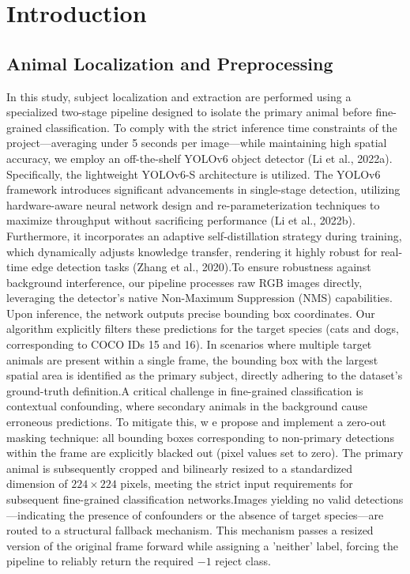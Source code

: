 \section{Introduction}
\label{sec:intro}


\subsection{Animal Localization and Preprocessing}
In this study, subject localization and extraction are performed using a specialized two-stage pipeline designed to isolate the primary animal before fine-grained classification. 
To comply with the strict inference time constraints of the project—averaging under 5 seconds per image—while maintaining high spatial accuracy, 
we employ an off-the-shelf YOLOv6 object detector (Li et al., 2022a). Specifically, the lightweight YOLOv6-S architecture is utilized. The YOLOv6 framework introduces significant advancements in 
single-stage detection, utilizing hardware-aware neural network design and re-parameterization techniques to maximize throughput without sacrificing performance (Li et al., 2022b). 
Furthermore, it incorporates an adaptive self-distillation strategy during training, which dynamically adjusts knowledge transfer, rendering it highly robust for real-time edge detection tasks 
(Zhang et al., 2020).To ensure robustness against background interference, our pipeline processes raw RGB images directly, leveraging the detector's native Non-Maximum Suppression (NMS) capabilities. 
Upon inference, the network outputs precise bounding box coordinates. Our algorithm explicitly filters these predictions for the target species (cats and dogs, corresponding to COCO IDs 15 and 16). 
In scenarios where multiple target animals are present within a single frame, the bounding box with the largest spatial area is identified as the primary subject, directly adhering to the dataset's 
ground-truth definition.A critical challenge in fine-grained classification is contextual confounding, where secondary animals in the background cause erroneous predictions. To mitigate this, w
e propose and implement a zero-out masking technique: all bounding boxes corresponding to non-primary detections within the frame are explicitly blacked out (pixel values set to zero). 
The primary animal is subsequently cropped and bilinearly resized to a standardized dimension of $224 \times 224$ pixels, meeting the strict input requirements for subsequent fine-grained 
classification networks.Images yielding no valid detections—indicating the presence of confounders or the absence of target species—are routed to a structural fallback mechanism. 
This mechanism passes a resized version of the original frame forward while assigning a 'neither' label, forcing the pipeline to reliably return the required $-1$ reject class.

